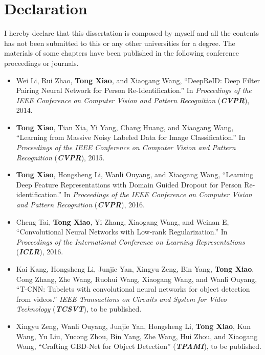 \chapter*{Declaration}

I hereby declare that this dissertation is composed by myself and all the contents has not been submitted to this or any other universities for a degree. The materials of some chapters have been published in the following conference proceedings or journals.

\begin{itemize}
  \item Wei Li, Rui Zhao, \textbf{Tong Xiao}, and Xiaogang Wang, ``DeepReID: Deep Filter Pairing Neural Network for Person Re-Identification.'' In \textit{Proceedings of the IEEE Conference on Computer Vision and Pattern Recognition} (\textit{\textbf{CVPR}}), 2014.

  \item \textbf{Tong Xiao}, Tian Xia, Yi Yang, Chang Huang, and Xiaogang Wang, ``Learning from Massive Noisy Labeled Data for Image Classification.'' In \textit{Proceedings of the IEEE Conference on Computer Vision and Pattern Recognition} (\textit{\textbf{CVPR}}), 2015.

  \item \textbf{Tong Xiao}, Hongsheng Li, Wanli Ouyang, and Xiaogang Wang, ``Learning Deep Feature Representations with Domain Guided Dropout for Person Re-identification.'' In \textit{Proceedings of the IEEE Conference on Computer Vision and Pattern Recognition} (\textit{\textbf{CVPR}}), 2016.

  \item Cheng Tai, \textbf{Tong Xiao}, Yi Zhang, Xiaogang Wang, and Weinan E, ``Convolutional Neural Networks with Low-rank Regularization.'' In \textit{Proceedings of the International Conference on Learning Representations} (\textit{\textbf{ICLR}}), 2016.

  \item Kai Kang, Hongsheng Li, Junjie Yan, Xingyu Zeng, Bin Yang, \textbf{Tong Xiao}, Cong Zhang, Zhe Wang, Ruohui Wang, Xiaogang Wang, and Wanli Ouyang, ``T-CNN: Tubelets with convolutional neural networks for object detection from videos.'' \textit{IEEE Transactions on Circuits and System for Video Technology} (\textit{\textbf{TCSVT}}), to be published.

  \item Xingyu Zeng, Wanli Ouyang, Junjie Yan, Hongsheng Li, \textbf{Tong Xiao}, Kun Wang, Yu Liu, Yucong Zhou, Bin Yang, Zhe Wang, Hui Zhou, and Xiaogang Wang, ``Crafting GBD-Net for Object Detection'' (\textit{\textbf{TPAMI}}), to be published.


\end{itemize}
